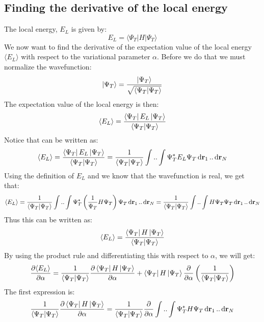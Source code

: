 \documentclass[a4paper, 10pt]{article}
\begin{document}
\begin{appendices}
		\section{Finding the derivative of the local energy}
		The local energy, $E_L$ is given by:
		\begin{equation}
		E_L=\langle \Psi_T | H| \Psi_T \rangle
		\end{equation}
We now want to find the derivative of the expectation value of the local energy $\langle E_{L}\rangle$
with respect to the variational parameter $\alpha$. Before we do that we must normalize the wavefunction:
\begin{align}
\ket{\Psi_{T}} = \frac{\ket{\Psi_{T}}}{\sqrt{\braket{\Psi_{T}}}}
\end{align}
The expectation value of the local energy is then:
\begin{align}
\langle E_{L} \rangle = \frac{\bra{\Psi_{T}}E_{L}\ket{\Psi_{T}}}{\braket{\Psi_{T}}}
\end{align}
Notice that can be written as:
\begin{align}
\langle E_{L} \rangle = \frac{\bra{\Psi_{T}}E_{L}\ket{\Psi_{T}}}{\braket{\Psi_{T}}}
= \frac{1}{\braket{\Psi_{T}}}\int..\int \Psi_{T}^{*}E_{L}\Psi_{T}\dd{\bold{r}_{1}}..\dd{\bold{r}_{N}}
\end{align}
Using the definition of $E_{L}$ and we know that the wavefunction is real, we get that:
\begin{align}
\langle E_{L} \rangle = \frac{1}{\braket{\Psi_{T}}}\int..\int \Psi_{T}^{*}\left(\frac{1}{\Psi_{T}}H\Psi_{T}\right)\Psi_{T}\dd{\bold{r}_{1}}..\dd{\bold{r}_{N}}
= \frac{1}{\braket{\Psi_{T}}}\int..\int H\Psi_{T}\Psi_{T}\dd{\bold{r}_{1}}..\dd{\bold{r}_{N}}
\end{align}
Thus this can be written as:
\begin{align}
\langle E_{L} \rangle = \frac{\bra{\Psi_{T}}H\ket{\Psi_{T}}}{\braket{\Psi_{T}}}
\end{align}
By using the product rule and differentiating this with respect to $\alpha$,
we will get:
\begin{align}
\pdv{\langle E_{L} \rangle }{\alpha} = \frac{1}{\braket{\Psi_{T}}}\pdv{\bra{\Psi_{T}}H\ket{\Psi_{T}}}{\alpha}
+ \bra{\Psi_{T}}H\ket{\Psi_{T}}\pdv{\alpha}\left(\frac{1}{\braket{\Psi_{T}}}\right)
\end{align}
The first expression is:
\begin{align}
\frac{1}{\braket{\Psi_{T}}}\pdv{\bra{\Psi_{T}}H\ket{\Psi_{T}}}{\alpha}
=
\frac{1}{\braket{\Psi_{T}}}\pdv{\alpha}\int..\int\Psi_{T}^{*}H\Psi_{T}\dd{\bold{r}_{1}}..\dd{\bold{r}_{N}}

\end{align}
\end{appendices}
\end{document}
